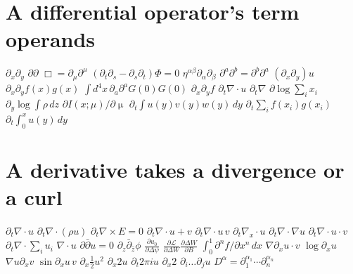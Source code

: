 \documentclass{article}
\begin{document}
\section{A differential operator's term operands}
$\partial_x\partial_y$ $\partial\partial$ $\Box=\partial_\mu\partial^\mu$ $(\partial_t\partial_s-\partial_s\partial_t)\Phi=0$
$\eta^{\alpha\beta}\partial_\alpha\partial_\beta$ $\partial^a\partial^b=\partial^b\partial^a$ $(\partial_x\partial_y)u$
$\partial_x\partial_y f(x)g(x)$ $\int d^4x\,\partial_a\partial^a G(0)G(0)$ $\partial_x\partial_y f$
$\partial_t\nabla\cdot u$ $\partial_t\nabla$ $\partial\log\sum_i x_i$ $\partial_y\log\int\rho\,dz$ $\partial I(x;\mu)/\partial\operatorname{\mu}$
$\partial_t\int u(y)v(y)w(y)\,dy$ $\partial_t\sum_i f(x_i)g(x_i)$ $\partial_t\int_0^x u(y)\,dy$
\section{A derivative takes a divergence or a curl}
$\partial_t\nabla\cdot u$ $\partial_t\nabla\cdot(\rho u)$ $\partial_t\nabla\times E=0$ $\partial_t\nabla\cdot u+v$ $\partial_t\nabla\cdot u\,v$
$\partial_t\nabla_x\cdot u$ $\partial_t\nabla\cdot\nabla u$ $\partial_t\nabla\cdot u\cdot v$ $\partial_t\nabla\cdot\sum_i u_i$ $\nabla\cdot u$
$\partial\bar\partial u=0$ $\partial_z\bar\partial_{\bar z}\phi$ $\frac{\partial u_0}{\partial\Delta\psi}$
$\frac{\partial\mathcal L}{\partial\Delta W}\frac{\partial\Delta W}{\partial B}$ $\int_0^1\partial^n f/\partial x^n\,dx$
$\nabla\partial_x u\cdot v$ $\log\partial_x u$ $\nabla u\partial_x v$ $\sin\partial_x u\,v$ $\partial_x\frac12 u^2$ $\partial_x 2u$
$\partial_t 2\pi iu$ $\partial_x 2$ $\partial_i\ldots\partial_j u$ $D^\alpha=\partial_1^{\alpha_1}\cdots\partial_n^{\alpha_n}$
\end{document}

